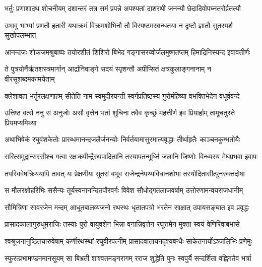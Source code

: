 \fourlineindentedshloka
{भर्तुः प्रणाशादथ शोचनीयम्}
{दशान्तरं तत्र समं प्रपन्ने}
{अपश्यतां दाशरथी जनन्यौ}
{छेदादिवोपघ्नतरोर्व्रतत्यौ} %

\fourlineindentedshloka
{उभावु भाभ्यां प्रणतौ हतारी}
{यथाक्रमं विक्रमशोभिनौ तौ}
{विस्पष्टमस्रान्धतया न दृष्टौ}
{ज्ञातौ सुतस्पर्श सुखोपलम्भात्} %

\fourlineindentedshloka
{आनन्दजः शोकजमश्रुबाष्पः}
{तयोरशीतं शिशिरो बिभेद}
{गङ्गासरय्वोर्जलमुष्णतप्तम्}
{हिमाद्रिनिस्यन्द इवावतीर्णः} %

\fourlineindentedshloka
{ते पुत्रयोर्नैर्ऋतशस्त्रमार्गान्}
{आर्द्रानिवाङ्गे सदयं स्पृशन्तौ}
{अपीप्सितं क्षत्रकुलाङ्गनानाम्}
{न वीरसूशब्दमकामयेताम्} %

\fourlineindentedshloka
{क्लेशावहा भर्तुरलक्षणाहम्}
{सीतेति नाम स्वमुदीरयन्ती}
{स्वर्गप्रतिष्ठस्य गुरोर्महिष्या}
{वभक्तिभेदेन वधूर्ववन्दे} %

\fourlineindentedshloka
{उत्तिष्ठ वत्से ननु स अनुजोः असौ}
{वृत्तेन भर्ता शुचिना तवैव}
{कृच्छ्रं महत्तीर्ण इव प्रियार्हाम्}
{तामूचतुस्ते प्रियमप्यमिथ्या} %

\fourlineindentedshloka
{अथाभिषेकं रघुवंशकेतोः}
{प्रारब्धमानन्दजलैर्जनन्योः}
{निर्वर्तयामासुरमात्यवृद्धाः}
{तीर्थाहृतैः काञ्चनकुम्भतोयैः} %

\fourlineindentedshloka
{सरित्समुद्रान्सरसीश्च गत्वा}
{रक्षःकपीन्द्रैरुपपादितानि}
{तस्यापतन्मूर्ध्नि जलानि जिष्णोः}
{विन्ध्यस्य मेघप्रभवा इवापः} %

\fourlineindentedshloka
{तपस्विवेषक्रिययापि तावत्}
{यः प्रेक्षणीयः सुतरां बभूव}
{राजेन्द्रनेपथ्यविधानशोभा}
{तस्योदितासीत्पुनरुक्तदोषा} %

\fourlineindentedshloka
{स मौलरक्षोहरिभिः ससैन्यः}
{तूर्यस्वनानन्दितपौरवर्गः}
{विवेश सौधोद्गतलाजवर्षाम्}
{उत्तोरणामन्वयराजधानीम्} %

\fourlineindentedshloka
{सौमित्रिणा सावरजेन मन्दम्}
{आधूतबालव्यजनो रथस्थः}
{धृतातपत्रो भरतेन साक्षात्}
{उपायसङ्घात इव प्रवृद्धः} %

\fourlineindentedshloka
{प्रासादकालागुरुधूमराजिः}
{तस्याः पुरो वायुवशेन भिन्ना}
{वनान्निवृत्तेन रघूत्तमेन}
{मुक्ता स्वयं वेणिरिवाबभासे} %

\fourlineindentedshloka
{श्वश्रूजनानुष्ठितचारुवेषाम्}
{कर्णीरथस्थां रघुवीरपत्नीम्}
{प्रासादवातायनदृश्यबन्धैः}
{साकेतनार्योऽञ्जलिभिः प्रणेमुः} %

\fourlineindentedshloka
{स्फुरत्प्रभामण्डनमानसूयम्}
{सा बिभ्रती शाश्वतमङ्गरागम्}
{रराज शुद्धेति पुनः स्वपुर्यै}
{सन्दर्शिता वह्निगतेव भर्त्रा} %


